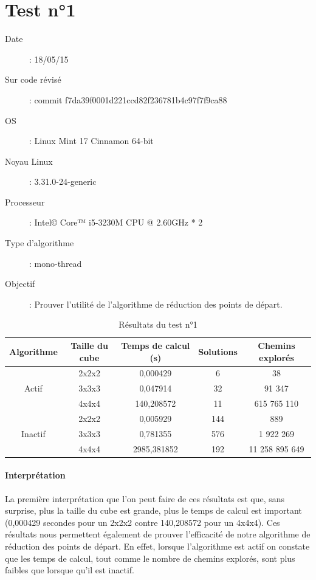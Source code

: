 \section{Test n°1}

\begin{description}
 \item[Date]: 18/05/15
 \item[Sur code révisé]: commit f7da39f0001d221ccd82f236781b4c97f7f9ca88
 \item[OS]: Linux Mint 17 Cinnamon 64-bit
 \item[Noyau Linux]: 3.31.0-24-generic
 \item[Processeur]: Intel© Core™ i5-3230M CPU @ 2.60GHz * 2
 \item[Type d'algorithme]: mono-thread
 \item[Objectif]: Prouver l'utilité de l'algorithme de réduction des points de départ.
\end{description}

\begin{table}[h]
\begin{tabular}{|*{5}{c|}}
\hline
Algorithme&Taille du cube&Temps de calcul (s)&Solutions&Chemins explorés \\
\hline
\multirow{3}{*}{Actif}&2x2x2&0,000429&6&38 \\
&3x3x3&0,047914&32&91 347 \\
&4x4x4&140,208572&11&615 765 110 \\
\hline
\multirow{3}{*}{Inactif}&2x2x2&0,005929&144&889 \\
&3x3x3&0,781355&576&1 922 269 \\
&4x4x4&2985,381852&192&11 258 895 649 \\
\hline
\end{tabular}
\caption{Résultats du test n°1}
\end{table}

\newpage

\paragraph{Interprétation} La première interprétation que l'on peut faire de ces résultats est que, sans surprise, plus la taille du cube est grande, plus le temps de calcul est important (0,000429 secondes pour un 2x2x2 contre 140,208572 pour un 4x4x4). Ces résultats nous permettent également de prouver l'efficacité de notre algorithme de réduction des points de départ. En effet, lorsque l'algorithme est actif on constate que les temps de calcul, tout comme le nombre de chemins explorés, sont plus faibles que lorsque qu'il est inactif.


